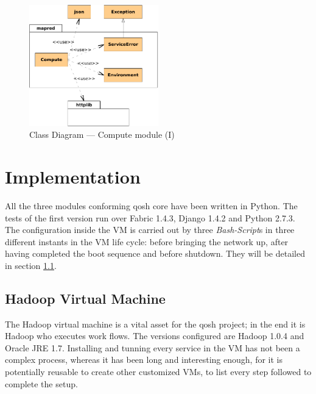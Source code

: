 \begin{figure}[tbp]
\begin{center}
\includegraphics[width=0.5\textwidth]{imagenes/027.pdf}
 \caption{Class Diagram --- Compute module (I)}
\label{fig:diagramaclasescompute1}
\end{center}
\end{figure}

\section{Implementation}\label{sec:implementacion}
\noindent All the three modules conforming qosh core have been written in Python. The tests of the first version run over Fabric 1.4.3, Django 1.4.2 and Python 2.7.3. The configuration inside the VM is carried out by three \emph{Bash-Script}s in three different instants in the VM life cycle: before bringing the network up, after having completed the boot sequence and before shutdown. They will be detailed in section \ref{subsec:maquinavirtual}.

\subsection{Hadoop Virtual Machine}\label{subsec:maquinavirtual}
\noindent The Hadoop virtual machine is a vital asset for the qosh project; in the end it is Hadoop who executes work flows. The versions configured are Hadoop 1.0.4 and Oracle JRE 1.7. Installing and tunning every service in the VM has not been a complex process, whereas it has been long and interesting enough, for it is potentially reusable to create other customized VMs, to list every step followed to complete the setup.

